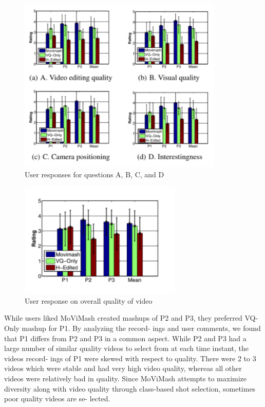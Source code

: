\documentclass[conference]{IEEEtran}
\begin{document}
\begin{figure}
    \centering
    \includegraphics{img7.png}
    \caption{User responses for questions A, B, C, and D}
    \label{fig:my_label}
\end{figure}

\begin{figure}
    \centering
    \includegraphics{img8.png}
    \small
    \caption{User response on overall quality of video}
    \label{fig:my_label}
\end{figure}

While users liked MoViMash created mashups of P2 and P3,
they preferred VQ-Only mashup for P1. By analyzing the record-
ings and user comments, we found that P1 differs from P2 and P3 in
a common aspect. While P2 and P3 had a large number of similar
quality videos to select from at each time instant, the videos record-
ings of P1 were skewed with respect to quality. There were 2 to 3
videos which were stable and had very high video quality, whereas
all other videos were relatively bad in quality. Since MoViMash
attempts to maximize diversity along with video quality through
class-based shot selection, sometimes poor quality videos are se-
lected.
\end{document}
